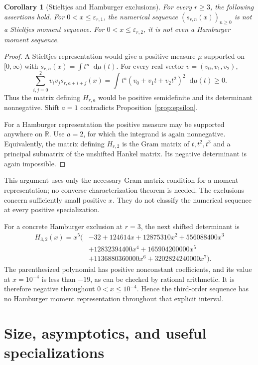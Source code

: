 \documentclass[11pt,a4paper]{article}
\newtheorem{corollary}[theorem]{Corollary}
\theoremstyle{definition}
\numberwithin{equation}{section}
\newcommand{\R}{\mathbb R}
\newcommand{\dd}{\mathop{}\!\mathrm{d}}
\begin{document}
\begin{corollary}[Stieltjes and Hamburger exclusions]
\label{cor:moments}
For every $r\ge3$, the following assertions hold.
For $0<x\le\varepsilon_{r,1}$, the numerical sequence
$(s_{r,n}(x))_{n\ge0}$ is not a Stieltjes moment sequence. For
$0<x\le\varepsilon_{r,2}$, it is not even a Hamburger moment sequence.
\end{corollary}
\begin{proof}
A Stieltjes representation would give a positive measure $\mu$ supported
on $[0,\infty)$ with
$s_{r,n}(x)=\int t^n\dd\mu(t)$. For every real vector
$v=(v_0,v_1,v_2)$,
\[
 \sum_{i,j=0}^2v_iv_j s_{r,a+i+j}(x)
  =\int t^a(v_0+v_1t+v_2t^2)^2\dd\mu(t)\ge0.
\]
Thus the matrix defining $H_{r,a}$ would be positive semidefinite and its
determinant nonnegative. Shift $a=1$ contradicts
Proposition~\ref{prop:epsilon}.

For a Hamburger representation the positive measure may be supported
anywhere on $\R$. Use $a=2$, for which the integrand is again
nonnegative. Equivalently, the matrix defining $H_{r,2}$ is the Gram
matrix of $t,t^2,t^3$ and a principal submatrix of the unshifted Hankel
matrix. Its negative determinant is again impossible.
\end{proof}

This argument uses only the necessary Gram-matrix condition for a
moment representation; no converse characterization theorem is needed.
The exclusions concern sufficiently small positive $x$. They do not
classify the numerical sequence at every positive specialization.

For a concrete Hamburger exclusion at $r=3$, the next shifted
determinant is
\begin{equation}
 \begin{split}
 H_{3,2}(x)=x^5\bigl(&-32+124614x+12875310x^2+556088400x^3\\
 &+12832394400x^4+165904200000x^5\\
 &+1136880360000x^6+3202824240000x^7\bigr).
 \end{split}
 \label{eq:H32}
\end{equation}
The parenthesized polynomial has positive nonconstant coefficients, and
its value at $x=10^{-4}$ is less than $-19$, as can be checked by rational
arithmetic. It is therefore negative throughout $0<x\le10^{-4}$.
Hence the third-order sequence has no Hamburger moment representation
throughout that explicit interval.

\section{Size, asymptotics, and useful specializations}
\label{sec:asymptotics}
\end{document}
